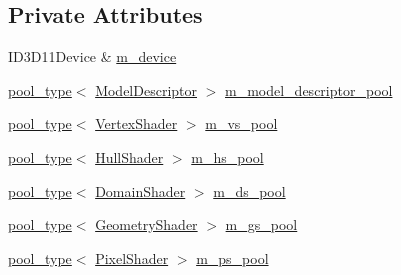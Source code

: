 \subsection*{Private Attributes}
\begin{DoxyCompactItemize}
\item 
I\+D3\+D11\+Device \& \mbox{\hyperlink{classmage_1_1rendering_1_1_resource_manager_ad5233c9a748dcd828e5176ad5e8282c9}{m\+\_\+device}}
\item 
\mbox{\hyperlink{classmage_1_1rendering_1_1_resource_manager_ab21a4e280087032ee533f267bd9bf602}{pool\+\_\+type}}$<$ \mbox{\hyperlink{classmage_1_1rendering_1_1_model_descriptor}{Model\+Descriptor}} $>$ \mbox{\hyperlink{classmage_1_1rendering_1_1_resource_manager_a43db83f825b58a85c34e633d5807171d}{m\+\_\+model\+\_\+descriptor\+\_\+pool}}
\item 
\mbox{\hyperlink{classmage_1_1rendering_1_1_resource_manager_ab21a4e280087032ee533f267bd9bf602}{pool\+\_\+type}}$<$ \mbox{\hyperlink{classmage_1_1rendering_1_1_vertex_shader}{Vertex\+Shader}} $>$ \mbox{\hyperlink{classmage_1_1rendering_1_1_resource_manager_ac4af09e51fbbcfb534edb72d98033979}{m\+\_\+vs\+\_\+pool}}
\item 
\mbox{\hyperlink{classmage_1_1rendering_1_1_resource_manager_ab21a4e280087032ee533f267bd9bf602}{pool\+\_\+type}}$<$ \mbox{\hyperlink{namespacemage_1_1rendering_aa133f36cd1a81c87eedf962270a12f48}{Hull\+Shader}} $>$ \mbox{\hyperlink{classmage_1_1rendering_1_1_resource_manager_acea62c6cf52bd332ee3e0d1575c02e29}{m\+\_\+hs\+\_\+pool}}
\item 
\mbox{\hyperlink{classmage_1_1rendering_1_1_resource_manager_ab21a4e280087032ee533f267bd9bf602}{pool\+\_\+type}}$<$ \mbox{\hyperlink{namespacemage_1_1rendering_a02bd57ea68f48dd6e0d37a1362ad1ea2}{Domain\+Shader}} $>$ \mbox{\hyperlink{classmage_1_1rendering_1_1_resource_manager_a49ccc18bfbca9728857d820266c3acf6}{m\+\_\+ds\+\_\+pool}}
\item 
\mbox{\hyperlink{classmage_1_1rendering_1_1_resource_manager_ab21a4e280087032ee533f267bd9bf602}{pool\+\_\+type}}$<$ \mbox{\hyperlink{namespacemage_1_1rendering_accaa3591de8a0d7a2c72c1dcc0cf9592}{Geometry\+Shader}} $>$ \mbox{\hyperlink{classmage_1_1rendering_1_1_resource_manager_aa8fe17aa004cb46afc132a672bbb014d}{m\+\_\+gs\+\_\+pool}}
\item 
\mbox{\hyperlink{classmage_1_1rendering_1_1_resource_manager_ab21a4e280087032ee533f267bd9bf602}{pool\+\_\+type}}$<$ \mbox{\hyperlink{namespacemage_1_1rendering_a19905114913398d5073148f6c416e1b7}{Pixel\+Shader}} $>$ \mbox{\hyperlink{classmage_1_1rendering_1_1_resource_manager_a73f970f19438b2e2f02a5ede41e8faf4}{m\+\_\+ps\+\_\+pool}}

\end{DoxyCompactItemize}
